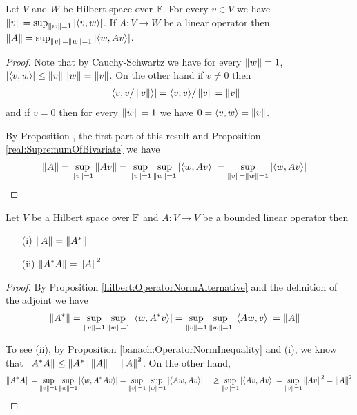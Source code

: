 \begin{prop}\label{hilbert:OperatorNormAlternative}Let $V$ and $W$ be Hilbert space over $\mathbb{F}$.   For every $v \in V$ we have $\left \lVert v \right \rVert = \sup_{\left \lVert w \right \rVert=1} \left \vert \langle v, w \rangle \right \vert$.  If $A : V \to W$ be a linear operator then $\left \lVert A \right \rVert = \sup_{\left \lVert v \right \rVert = \left \lVert w \right \rVert = 1} \left \vert \langle w, A v \rangle \right \vert$.
\end{prop}
\begin{proof}
Note that by Cauchy-Schwartz we have for every $\left \lVert w \right \rVert = 1$,$\left \vert \langle v, w \rangle \right \vert \leq \left \lVert v \right \rVert\left \lVert w \right \rVert = \left \lVert v \right \rVert$.  On the other hand if $v \neq 0$ then 
\begin{align*}
\left \vert \langle v, v/\left \lVert v \right \rVert \rangle \right \vert &= \langle v, v \rangle/\left \lVert v \right \rVert = \left \lVert v \right \rVert 
\end{align*}
and if $v = 0$ then for every $\left \lVert w \right \rVert = 1$ we have $0 = \langle v, w \rangle = \left \lVert v \right \rVert$.

By Proposition \label{banach:OperatorNormAlternative}, the first part of this result and Proposition \ref{real:SupremumOfBivariate} we have 
\begin{align*}
\left \lVert A \right \rVert &= \sup_{\left \lVert v \right \rVert=1} \left \lVert Av \right \rVert  = \sup_{\left \lVert v \right \rVert=1} \sup_{\left \lVert w \right \rVert=1} \left \vert \langle w, A v \rangle \right \vert = \sup_{\left \lVert v \right \rVert=\left \lVert w \right \rVert=1} \left \vert \langle w, A v \rangle \right \vert 
\end{align*}
\end{proof}

\begin{prop}\label{hilbert:NormOfAdjoint}Let $V$ be a Hilbert space over $\mathbb{F}$ and $A : V \to V$ be a bounded linear operator then
\begin{itemize}
\item[(i)] $\left \lVert A \right \rVert = \left \lVert {A}^* \right \rVert$
\item[(ii)] $\left \lVert {A}^* A \right \rVert = \left \lVert A \right \rVert^2$
\end{itemize}
\end{prop}
\begin{proof}
By Proposition \ref{hilbert:OperatorNormAlternative} and the definition of the adjoint we have
\begin{align*}
\left \lVert {A}^* \right \rVert &= \sup_{\left \lVert v \right \rVert=1} \sup_{\left \lVert w \right \rVert=1} \left \vert \langle w, {A}^* v \rangle \right \vert = \sup_{\left \lVert v \right \rVert=1} \sup_{\left \lVert w \right \rVert=1} \left \vert \langle Aw,  v \rangle \right \vert = \left \lVert A \right \rVert
\end{align*}

To see (ii), by Proposition \ref{banach:OperatorNormInequality} and (i), we know that $\left \lVert {A}^* A \right \rVert \leq \left \lVert {A}^* \right \rVert \left \lVert A \right \rVert = \left \lVert A \right \rVert^2$.  On the other hand,
\begin{align*}
\left \lVert {A}^* A \right \rVert  &= \sup_{\left \lVert v \right \rVert=1} \sup_{\left \lVert w \right \rVert=1} \left \vert \langle w, {A}^* A v \rangle \right \vert = \sup_{\left \lVert v \right \rVert=1} \sup_{\left \lVert w \right \rVert=1} \left \vert \langle A w, A v \rangle \right \vert \
&\geq \sup_{\left \lVert v \right \rVert = 1} \left \vert \langle A v, A v \rangle \right \vert = \sup_{\left \lVert v \right \rVert = 1} \left \lVert Av \right \rVert^2 = \left \lVert A \right \rVert^2
\end{align*}
\end{proof}

